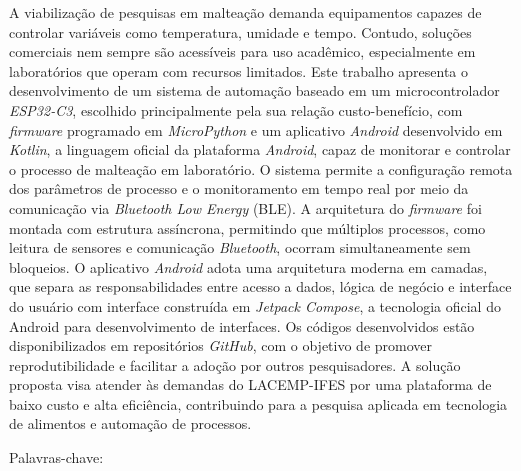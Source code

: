 \begin{resumo}
  \vspace{-15pt}
  
  A viabilização de pesquisas em malteação demanda equipamentos capazes de controlar variáveis como temperatura, umidade e tempo. Contudo, soluções comerciais nem sempre são acessíveis para uso acadêmico, especialmente em laboratórios que operam com recursos limitados. Este trabalho apresenta o desenvolvimento de um sistema de automação baseado em um microcontrolador \textit{ESP32-C3}, escolhido principalmente pela sua relação custo-benefício, com \textit{firmware} programado em \textit{MicroPython} e um aplicativo \textit{Android} desenvolvido em \textit{Kotlin}, a linguagem oficial da plataforma \textit{Android}, capaz de monitorar e controlar o processo de malteação em laboratório. O sistema permite a configuração remota dos parâmetros de processo e o monitoramento em tempo real por meio da comunicação via \textit{Bluetooth Low Energy} (BLE). A arquitetura do \textit{firmware} foi montada com estrutura assíncrona, permitindo que múltiplos processos, como leitura de sensores e comunicação \textit{Bluetooth}, ocorram simultaneamente sem bloqueios. O aplicativo \textit{Android} adota uma arquitetura moderna em camadas, que separa as responsabilidades entre acesso a dados, lógica de negócio e interface do usuário com interface construída em \textit{Jetpack Compose}, a tecnologia oficial do Android para desenvolvimento de interfaces. Os códigos desenvolvidos estão disponibilizados em repositórios \textit{GitHub}, com o objetivo de promover reprodutibilidade e facilitar a adoção por outros pesquisadores. A solução proposta visa atender às demandas do LACEMP-IFES por uma plataforma de baixo custo e alta eficiência, contribuindo para a pesquisa aplicada em tecnologia de alimentos e automação de processos.

  Palavras-chave: \palavraschaveemlinha
\end{resumo}


